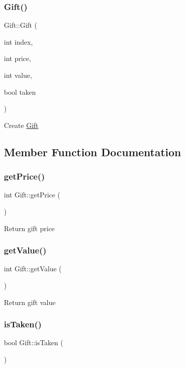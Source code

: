 \subsubsection{\texorpdfstring{Gift()}{Gift()}}
{\footnotesize\ttfamily Gift\+::\+Gift (\begin{DoxyParamCaption}\item[{int}]{index,  }\item[{int}]{price,  }\item[{int}]{value,  }\item[{bool}]{taken }\end{DoxyParamCaption})}

Create \hyperlink{class_gift}{Gift} 

\subsection{Member Function Documentation}
\mbox{\label{class_gift_aa114ca9629b5f02e4df6731d33c69373}} 
\subsubsection{\texorpdfstring{get\+Price()}{getPrice()}}
{\footnotesize\ttfamily int Gift\+::get\+Price (\begin{DoxyParamCaption}{ }\end{DoxyParamCaption})}

Return gift price \mbox{\label{class_gift_aabddc4d671de70d9002461076999a574}} 
\subsubsection{\texorpdfstring{get\+Value()}{getValue()}}
{\footnotesize\ttfamily int Gift\+::get\+Value (\begin{DoxyParamCaption}{ }\end{DoxyParamCaption})}

Return gift value \mbox{\label{class_gift_ab2c9c5d3db64a71a6cd6263648c89167}} 
\subsubsection{\texorpdfstring{is\+Taken()}{isTaken()}}
{\footnotesize\ttfamily bool Gift\+::is\+Taken (\begin{DoxyParamCaption}{ }\end{DoxyParamCaption})}

